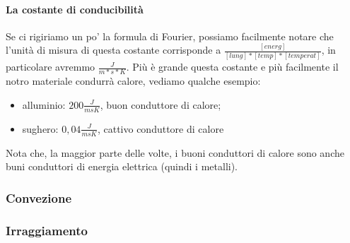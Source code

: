             \paragraph{La costante di conducibilità}
                Se ci rigiriamo un po' la formula di Fourier, possiamo facilmente notare che l'unità di misura di questa costante corrisponde a $\frac{[energ]}{[lung]*[temp]*[temperat]}$, in particolare avremmo $\frac{J}{m*s*K}$. Più è grande questa costante e più facilmente il notro materiale condurrà calore, vediamo qualche esempio:
                \begin{itemize}
                    \item alluminio: $200\frac{J}{msK}$, buon conduttore di calore;
                    \item sughero: $0,04\frac{J}{msK}$, cattivo conduttore di calore
                \end{itemize}
                Nota che, la maggior parte delle volte, i buoni conduttori di calore sono anche buni conduttori di energia elettrica (quindi i metalli).


        \subsubsection{Convezione}
        \subsubsection{Irraggiamento}
